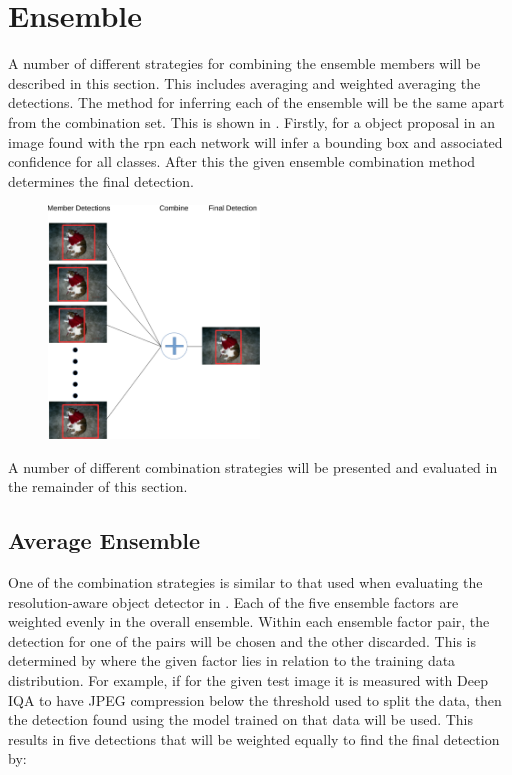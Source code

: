 \section{Ensemble}
A number of different strategies for combining the ensemble members will be described in this section. This includes averaging and weighted averaging the detections. The method for inferring each of the ensemble will be the same apart from the combination set. This is shown in . Firstly, for a object proposal in an image found with the \gls{rpn} each network will infer a bounding box and associated confidence for all classes. After this the given ensemble combination method determines the final detection. 
\begin{figure}[H]
  \centering
    \includegraphics[width=0.5\textwidth]{Figs/Implementation/ensemble.pdf}
      \caption{}
    \label{fig:ensemble_general}
\end{figure}

A number of different combination strategies will be presented and evaluated in the remainder of this section. 

\subsection{Average Ensemble}
One of the combination strategies is similar to that used when evaluating the resolution-aware object detector in . Each of the five ensemble factors are weighted evenly in the overall ensemble. Within each ensemble factor pair, the detection for one of the pairs will be chosen and the other discarded. This is determined by where the given factor lies in relation to the training data distribution. For example, if for the given test image it is measured with Deep IQA to have JPEG compression below the threshold used to split the data, then the detection found using the model trained on that data will be used. This results in five detections that will be weighted equally to find the final detection by:

